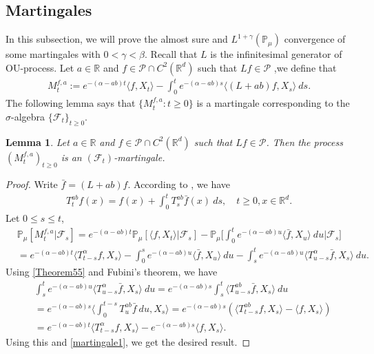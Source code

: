 \documentclass[12pt,oneside,english]{amsart}
\theoremstyle{plain}
\newtheorem{lem}[thm]{Lemma}
\theoremstyle{definition}
\numberwithin{equation}{section}
\begin{document}
\subsection{Martingales}
    In this subsection, we will prove the almost sure and $L^{1+\gamma}(\mathbb{P}_{\mu})$ convergence of some martingales with $0<\gamma<\beta$. Recall that $L$ is the infinitesimal generator of OU-process. Let $a\in \mathbb{R}$ and $f\in \mathcal{P}\cap C^2(\mathbb{R}^d)$ such that $Lf \in \mathcal{P}$ ,we define that
\begin{align}
\label{defmartingale}
    M_t^{f,a}:=e^{-(\alpha-ab)t}\langle f,X_t\rangle-\int_0^t e^{-(\alpha-ab)s}\langle (L+ab)f, X_s\rangle~ ds.
\end{align}
    The following lemma says that $\{M_t^{f,a}: t\geq 0\}$ is a martingale corresponding to the $\sigma$-algebra $\{\mathscr{F}_t\}_{t\geq 0}$.
\begin{lem}
\label{lemma25}
    Let $a\in \mathbb R$ and $f\in \mathcal{P}\cap C^2(\mathbb{R}^d)$ such that $Lf \in \mathcal{P}$. Then the process $(M_t^{f,a})_{t\geq 0}$ is an $(\mathscr F_t)$-martingale.
\end{lem}
\begin{proof}
    Write $\bar{f}=(L+ab)f$. According to \cite[Theorem A.55]{Li2011Measure-valued}, we have
\begin{align}\label{Theorem55}
    T_t^{ab}f(x)= f(x)+\int_0^t T_s^{ab}\bar{f}(x)~ds,\quad t\geq 0,x\in \mathbb{R}^d.
\end{align}
Let $0\leq s\leq t$,
\begin{align}
\label{martingale1}
    &\mathbb{P}_{\mu}[M_t^{f,a}|\mathscr{F}_s]
    =e^{-(\alpha-ab)t}\mathbb{P}_{\mu}\left[\langle f,X_t\rangle|\mathscr{F}_s\right]-\mathbb{P}_{\mu}\Big[\int_0^t e^{-(\alpha-ab)u}\langle \bar{f}, X_u\rangle~ du\Big|\mathscr{F}_s\big]
    \\&=e^{-(\alpha-ab)t}\langle T_{t-s}^{\alpha}f, X_s\rangle-\int_0^s e^{-(\alpha-ab)u}\langle \bar{f}, X_u\rangle~ du -\int_s^t e^{-(\alpha-ab)u}\langle T_{u-s}^{\alpha} \bar{f},X_s\rangle~ du.
\end{align}
    Using \eqref{Theorem55} and Fubini's theorem, we have
\begin{align}
    &\int_s^t e^{-(\alpha-ab)u}\langle T_{u-s}^{\alpha} \bar{f},X_s\rangle~ du=e^{-(\alpha-ab)s}\int_s^t\langle T_{u-s}^{ab}\bar{f},X_s\rangle~du\\
    &=e^{-(\alpha-ab)s}\Big\langle\int_0^{t-s}T_{u}^{ab}\bar{f}~du,X_s\Big\rangle=e^{-(\alpha-ab)s}\left(\langle T_{t-s}^{ab}f,X_s\rangle-\langle
    f,X_s\rangle\right)\\
    &=e^{-(\alpha-ab)t}\langle T_{t-s}^{\alpha}f, X_s\rangle-e^{-(\alpha-ab)s}\langle
    f,X_s\rangle.
\end{align}
   Using this and \eqref{martingale1}, we get the desired result.
\end{proof}
\end{document}
